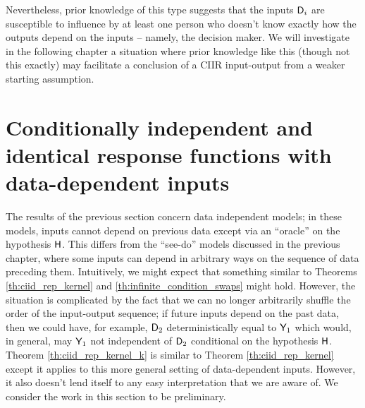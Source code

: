 Nevertheless, prior knowledge of this type suggests that the inputs $\mathsf{D}_i$ are susceptible to influence by at least one person who doesn't know exactly how the outputs depend on the inputs -- namely, the decision maker. We will investigate in the following chapter a situation where prior knowledge like this (though not this exactly) may facilitate a conclusion of a CIIR input-output from a weaker starting assumption.

\section[Data-dependent inputs]{Conditionally independent and identical response functions with data-dependent inputs}\label{sec:data_dependent}

The results of the previous section concern data independent models; in these models, inputs cannot depend on previous data except via an ``oracle'' on the hypothesis $\mathsf{H}$. This differs from the ``see-do'' models discussed in the previous chapter, where some inputs can depend in arbitrary ways on the sequence of data preceding them. Intuitively, we might expect that something similar to Theorems \ref{th:ciid_rep_kernel} and \ref{th:infinite_condition_swaps} might hold. However, the situation is complicated by the fact that we can no longer arbitrarily shuffle the order of the input-output sequence; if future inputs depend on the past data, then we could have, for example, $\mathsf{D}_2$ deterministically equal to $\mathsf{Y}_1$ which would, in general, may $\mathsf{Y}_1$ not independent of $\mathsf{D}_2$ conditional on the hypothesis $\mathsf{H}$. Theorem \ref{th:ciid_rep_kernel_k} is similar to Theorem \ref{th:ciid_rep_kernel} except it applies to this more general setting of data-dependent inputs. However, it also doesn't lend itself to any easy interpretation that we are aware of. We consider the work in this section to be preliminary.

